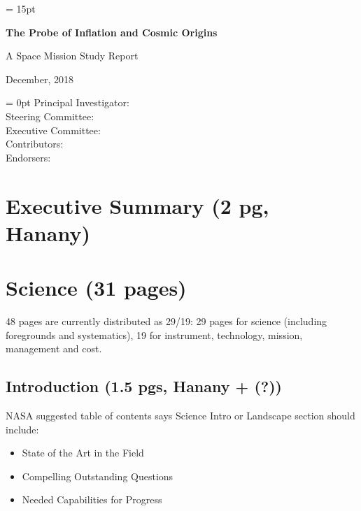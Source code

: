 \documentclass[12pt]{article}
\begin{document}


\setlength{\baselineskip}{0.96\baselineskip} %
\setlength{\parskip}{1.\parskip}

\parindent = 15pt


\setcounter{page}{0}
\setcounter{figure}{0}

\LARGE{ \centerline{\bf{The Probe of Inflation and Cosmic Origins}}}
\vspace{0.5in}
\Large{ \centerline{A Space Mission Study Report}}
\Large{ \centerline{December, 2018 }}
\vspace{0.5in}
\parindent = 0pt
\large{Principal Investigator:} \\
\large{Steering Committee:} \\
\large{Executive Committee:} \\
\large{Contributors:} \\
\large{Endorsers:} \\

\normalsize

\newpage

%


\section{Executive Summary (2 pg, Hanany)} 


\section{Science (31 pages)}

48 pages are currently distributed as 29/19: 29 pages for science (including foregrounds and systematics), 19 for instrument, technology, mission, management and cost.

    \subsection{Introduction (1.5 pgs, Hanany + (?))}
     NASA suggested table of contents says Science Intro or Landscape section should include:
        \begin{itemize}
        \item State of the Art in the Field
        \item Compelling Outstanding Questions
        \item Needed Capabilities for Progress
        \end{itemize}
\end{document}
